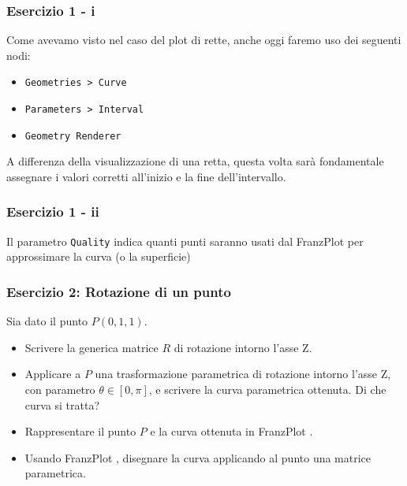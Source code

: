 \documentclass{beamer}
\newcommand{\fig}{figures} %
\newcommand{\frnzplt}{FranzPlot }
\begin{document}
\begin{frame}
\frametitle{Esercizio 1 - i}
    Come avevamo visto nel caso del plot di rette, anche oggi faremo uso dei seguenti nodi:
    \begin{itemize}
        \item \texttt{Geometries > Curve} 
        \item \texttt{Parameters > Interval}
        \item \texttt{Geometry Renderer}
    \end{itemize}

    \vspace{0.5cm}
    A differenza della visualizzazione di una retta, questa volta sar\`a fondamentale assegnare i valori corretti
    all'inizio e la fine dell'intervallo.
\end{frame}
%
\begin{frame}
\frametitle{Esercizio 1 - ii}
\begin{center}
\end{center}
    Il parametro \texttt{Quality} indica quanti punti saranno usati dal \frnzplt per
    approssimare la curva (o la superficie)

\end{frame}
\begin{frame}
\frametitle{Esercizio 2: Rotazione di un punto}

    Sia dato il punto $P(0, 1, 1)$.
    \begin{itemize}
        \item Scrivere la generica matrice $R$ di rotazione intorno l'asse Z.
        \item Applicare a $P$ una trasformazione parametrica di rotazione intorno l'asse Z, con parametro $\theta \in [0, \pi]$,
            e scrivere la curva parametrica ottenuta. Di che curva si tratta?
        \item Rappresentare il punto $P$ e la curva ottenuta in \frnzplt.
        \item Usando \frnzplt, disegnare la curva applicando al punto una matrice parametrica.
    \end{itemize}

\end{frame}
\end{document}
